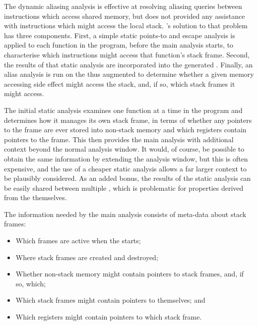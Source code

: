 

The dynamic aliasing analysis is effective at resolving aliasing
queries between instructions which access shared memory, but does not
provided any assistance with instructions which might access the local
stack.  {\Technique}'s solution to that problem has three components.
First, a simple static points-to and escape analysis is applied to
each function in the program, before the main analysis starts, to
characterise which instructions might access that function's stack
frame.  Second, the results of that static analysis are incorporated
into the generated {\StateMachines}.  Finally, an alias analysis is
run on the thus augmented {\StateMachines} to determine whether a
given memory accessing side effect might access the stack, and, if so,
which stack frames it might access.

The initial static analysis examines one function at a time in the
program and determines how it manages its own stack frame, in terms of
whether any pointers to the frame are ever stored into non-stack
memory and which registers contain pointers to the frame.  This then
provides the main analysis with additional context beyond the normal
analysis window.  It would, of course, be possible to obtain the same
information by extending the analysis window, but this is often expensive, and
the use of a cheaper static analysis allows a far larger context to be
plausibly considered.  As an added bonus, the results of the static
analysis can be easily shared between multiple {\StateMachines}, which
is problematic for properties derived from the {\StateMachines}
themselves.

The information needed by the main analysis consists of meta-data
about stack frames:

\begin{itemize}
\item
  Which frames are active when the {\StateMachine} starts;
\item
  Where stack frames are created and destroyed;
\item
  Whether non-stack memory might contain pointers to stack frames,
  and, if so, which;
\item
  Which stack frames might contain pointers to themselves; and
\item
  Which registers might contain pointers to which stack frame.
\end{itemize}

